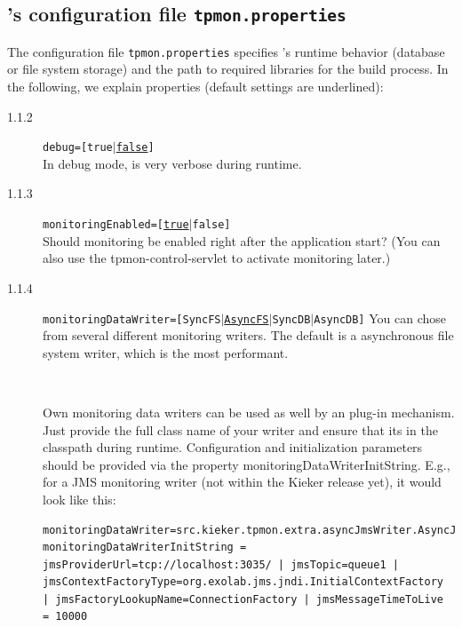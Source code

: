 \documentclass[a4paper,12pt]{scrartcl}
\begin{document}
\subsection{\tpmon{}'s configuration file \texttt{tpmon.properties}}\label{sec.tpmon.properties}

The configuration file \texttt{tpmon.properties} specifies \tpmon{}'s runtime behavior (database or file system
storage) and the path to required libraries for the build process. In the following, we explain properties (default settings are underlined):

\begin{description}
\item [1.1.2] \texttt{debug=[true$|$\underline{false}]}  \\
In debug mode, \tpmon{} is very verbose during runtime.
\item [1.1.3] \texttt{monitoringEnabled=[\underline{true}$|$false]} \\
Should monitoring be enabled right after the application start? (You can also use the tpmon-control-servlet to activate monitoring later.)
\item [1.1.4] \texttt{monitoringDataWriter=[SyncFS$|$\underline{AsyncFS}$|$SyncDB$|$AsyncDB]}
You can chose from several different monitoring writers. The default is a asynchronous file system writer, which is the most performant.

\

Own monitoring data writers can be used as well by an plug-in mechanism. Just provide the full class name of your writer and ensure that its in the 
classpath during runtime. Configuration and initialization parameters should be provided via the property monitoringDataWriterInitString. E.g., for a JMS monitoring writer (not within the Kieker release yet), it would look like this:\\
\begin{lstlisting}[caption={}]
monitoringDataWriter=src.kieker.tpmon.extra.asyncJmsWriter.AsyncJmsProducer
monitoringDataWriterInitString = jmsProviderUrl=tcp://localhost:3035/ | jmsTopic=queue1 | jmsContextFactoryType=org.exolab.jms.jndi.InitialContextFactory | jmsFactoryLookupName=ConnectionFactory | jmsMessageTimeToLive = 10000
\end{lstlisting}



\end{description}
\end{document}
